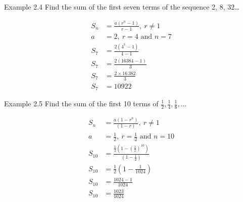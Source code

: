 \begin{example}{Example 2.4}
Find the sum of the first seven terms of the sequence 2, 8, 32\ldots

\solution
\begin{align*}
  S_n &= \frac{a(r^n - 1)}{r - 1},\ r \ne 1 \\
  a &= 2,\ r = 4 \text{ and } n = 7 \\
  S_7 &= \frac{2(4^7 - 1)}{4 - 1} \\
  S_7 &= \frac{2(16384 - 1)}{3} \\
  S_7 &= \frac{2 \times 16\,382}{3} \\
  S_7 &= 10922
\end{align*}
\end{example}

\begin{example}{Example 2.5}
Find the sum of the first 10 terms of $\frac{1}{2}, \frac{1}{4}, \frac{1}{8}, \ldots$

\solution
\begin{align*}
  S_n &= \frac{a(1 - r^n)}{(1 - r)},\ r \ne 1 \\
  a &= \frac{1}{2},\ r = \frac{1}{2} \text{ and } n = 10 \\
  S_{10} &= \frac{\frac{1}{2}\left(1 - \left(\frac{1}{2}\right)^{10}\right)}{\left(1 - \frac{1}{2}\right)} \\
  S_{10} &= \frac{1}{2}\left(1 - \frac{1}{1024}\right) \\
  S_{10} &= \frac{1024 - 1}{1024} \\
  S_{10} &= \frac{1023}{1024}
\end{align*}
\end{example}
